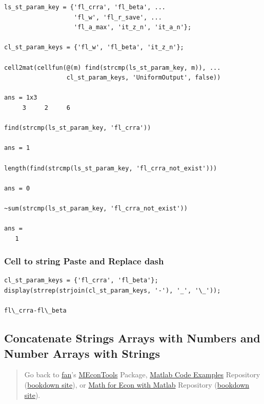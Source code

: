 \documentclass[
]{book}
\begin{document}
\begin{verbatim}
ls_st_param_key = {'fl_crra', 'fl_beta', ...
                   'fl_w', 'fl_r_save', ...
                   'fl_a_max', 'it_z_n', 'it_a_n'};

cl_st_param_keys = {'fl_w', 'fl_beta', 'it_z_n'};

cell2mat(cellfun(@(m) find(strcmp(ls_st_param_key, m)), ...
                 cl_st_param_keys, 'UniformOutput', false))

ans = 1x3    
     3     2     6

find(strcmp(ls_st_param_key, 'fl_crra'))

ans = 1

length(find(strcmp(ls_st_param_key, 'fl_crra_not_exist')))

ans = 0

~sum(strcmp(ls_st_param_key, 'fl_crra_not_exist'))

ans = 
   1
\end{verbatim}

\hypertarget{cell-to-string-paste-and-replace-dash}{%
\subsubsection{Cell to string Paste and Replace dash}\label{cell-to-string-paste-and-replace-dash}}

\begin{verbatim}
cl_st_param_keys = {'fl_crra', 'fl_beta'};
display(strrep(strjoin(cl_st_param_keys, '-'), '_', '\_'));

fl\_crra-fl\_beta
\end{verbatim}

\hypertarget{concatenate-strings-arrays-with-numbers-and-number-arrays-with-strings}{%
\subsection{Concatenate Strings Arrays with Numbers and Number Arrays with Strings}\label{concatenate-strings-arrays-with-numbers-and-number-arrays-with-strings}}

\begin{quote}
Go back to \href{http://fanwangecon.github.io/}{fan}'s \href{https://fanwangecon.github.io/MEconTools/}{MEconTools} Package, \href{https://fanwangecon.github.io/M4Econ/}{Matlab Code Examples} Repository (\href{https://fanwangecon.github.io/M4Econ/bookdown}{bookdown site}), or \href{https://fanwangecon.github.io/Math4Econ/}{Math for Econ with Matlab} Repository (\href{https://fanwangecon.github.io/Math4Econ/bookdown}{bookdown site}).
\end{quote}
\end{document}
